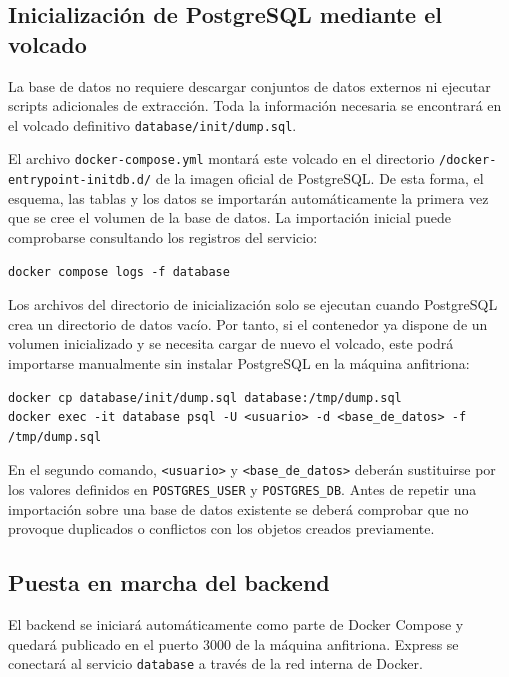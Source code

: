 \subsection{Inicializaci\'on de PostgreSQL mediante el volcado}

La base de datos no requiere descargar conjuntos de datos externos ni ejecutar
scripts adicionales de extracci\'on. Toda la informaci\'on necesaria se encontrar\'a
en el volcado definitivo \texttt{database/init/dump.sql}.

El archivo \texttt{docker-compose.yml} montar\'a este volcado en el directorio
\texttt{/docker-entrypoint-initdb.d/} de la imagen oficial de PostgreSQL. De esta
forma, el esquema, las tablas y los datos se importar\'an autom\'aticamente la
primera vez que se cree el volumen de la base de datos. La importaci\'on inicial
puede comprobarse consultando los registros del servicio:

\begin{lstlisting}
docker compose logs -f database
\end{lstlisting}

Los archivos del directorio de inicializaci\'on solo se ejecutan cuando PostgreSQL
crea un directorio de datos vac\'io. Por tanto, si el contenedor ya dispone de un
volumen inicializado y se necesita cargar de nuevo el volcado, este podr\'a
importarse manualmente sin instalar PostgreSQL en la m\'aquina anfitriona:

\begin{lstlisting}
docker cp database/init/dump.sql database:/tmp/dump.sql
docker exec -it database psql -U <usuario> -d <base_de_datos> -f /tmp/dump.sql
\end{lstlisting}

En el segundo comando, \texttt{<usuario>} y \texttt{<base\_de\_datos>} deber\'an
sustituirse por los valores definidos en \texttt{POSTGRES\_USER} y
\texttt{POSTGRES\_DB}. Antes de repetir una importaci\'on sobre una base de datos
existente se deber\'a comprobar que no provoque duplicados o conflictos con los
objetos creados previamente.

\subsection{Puesta en marcha del backend}

El backend se iniciar\'a autom\'aticamente como parte de Docker Compose y quedar\'a
publicado en el puerto 3000 de la m\'aquina anfitriona. Express se conectar\'a al
servicio \texttt{database} a trav\'es de la red interna de Docker.

